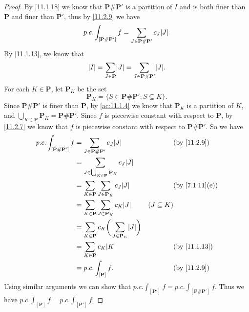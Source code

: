 \begin{proof}
  By \cref{11.1.18} we know that \(\mathbf{P} \# \mathbf{P}'\) is a partition of \(I\) and is both finer than \(\mathbf{P}\) and finer than \(\mathbf{P}'\), thus by \cref{11.2.9} we have
  \[
    p.c. \int_{[\mathbf{P} \# \mathbf{P}']} f = \sum_{J \in \mathbf{P} \# \mathbf{P}'} c_J \abs{J}.
  \]
  By \cref{11.1.13}, we know that
  \[
    \abs{I} = \sum_{J \in \mathbf{P}} \abs{J} = \sum_{J \in \mathbf{P} \# \mathbf{P}'} \abs{J}.
  \]
  For each \(K \in \mathbf{P}\), let \(\mathbf{P}_K\) be the set
  \[
    \mathbf{P}_K = \{S \in \mathbf{P} \# \mathbf{P}' : S \subseteq K\}.
  \]
  Since \(\mathbf{P} \# \mathbf{P}'\) is finer than \(\mathbf{P}\), by \cref{ac:11.1.4} we know that \(\mathbf{P}_K\) is a partition of \(K\), and \(\bigcup_{K \in \mathbf{P}} \mathbf{P}_K = \mathbf{P} \# \mathbf{P}'\).
  Since \(f\) is piecewise constant with respect to \(\mathbf{P}\), by \cref{11.2.7} we know that \(f\) is piecewise constant with respect to \(\mathbf{P} \# \mathbf{P}'\).
  So we have
  \begin{align*}
    p.c. \int_{[\mathbf{P} \# \mathbf{P}']} f & = \sum_{J \in \mathbf{P} \# \mathbf{P}'} c_J \abs{J}                        &                 & \text{(by \cref{11.2.9})}    \\
                                              & = \sum_{J \in \bigcup_{K \in \mathbf{P}} \mathbf{P}_K} c_J \abs{J}                                                           \\
                                              & = \sum_{K \in \mathbf{P}} \sum_{J \in \mathbf{P}_K} c_J \abs{J}             &                 & \text{(by \cref{7.1.11}(e))} \\
                                              & = \sum_{K \in \mathbf{P}} \sum_{J \in \mathbf{P}_K} c_K \abs{J}             & (J \subseteq K)                                \\
                                              & = \sum_{K \in \mathbf{P}} c_K \bigg(\sum_{J \in \mathbf{P}_K} \abs{J}\bigg)                                                  \\
                                              & = \sum_{K \in \mathbf{P}} c_K \abs{K}                                       &                 & \text{(by \cref{11.1.13})}   \\
                                              & = p.c. \int_{[\mathbf{P}]} f.                                               &                 & \text{(by \cref{11.2.9})}
  \end{align*}
  Using similar arguments we can show that \(p.c. \int_{[\mathbf{P}']} f = p.c. \int_{[\mathbf{P} \# \mathbf{P}']} f\).
  Thus we have \(p.c. \int_{[\mathbf{P}]} f = p.c. \int_{[\mathbf{P}']} f\).
\end{proof}

